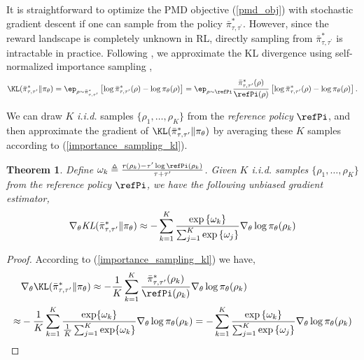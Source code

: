 \documentclass{article}
\newtheorem{thm}{Theorem}
\begin{document}
It is straightforward to optimize the PMD objective (\ref{pmd_obj}) with stochastic gradient descent if one can sample from the policy $\bar{\pi}_{\tau,\tau^{\prime}}^*$. However, since the reward landscape is completely unknown in RL, directly sampling from $\bar{\pi}_{\tau,\tau^{\prime}}^*$ is intractable in practice. Following \cite{nachum2017improving}, we approximate the KL divergence using self-normalized importance sampling \cite{owen2013monte},
\begin{equation}
\label{importance_sampling_kl}
\KL(\bar{\pi}_{\tau,\tau^{\prime}}^* \| \pi_\theta) = \ep_{\rho \sim \bar{\pi}_{\tau,\tau^{\prime}}^* } \left[ \log \bar{\pi}_{\tau,\tau^{\prime}}^*(\rho) - \log \pi_\theta(\rho) \right] = \ep_{\rho\sim \refPi} \frac{\bar{\pi}_{\tau,\tau^{\prime}}^*(\rho)}{\refPi(\rho)} \left[ \log \bar{\pi}_{\tau,\tau^{\prime}}^*(\rho) - \log \pi_\theta(\rho) \right].
\end{equation}

We can draw $K$ \textit{i.i.d.} samples $\{\rho_1, \dots, \rho_K\}$ from the \emph{reference policy} $\refPi$, and then approximate the gradient of $\KL(\bar{\pi}_{\tau,\tau^{\prime}}^* \| \pi_\theta)$ by averaging these $K$ samples according to (\ref{importance_sampling_kl}). 

\begin{thm}
Define $\omega_k \triangleq \frac{r(\rho_k) - \tau^{\prime} \log{\refPi(\rho_k)} }{\tau + \tau^{\prime}}$. Given $K$ \emph{i.i.d.} samples $\{\rho_1, \dots, \rho_K\}$ from the \emph{reference policy} $\refPi$, we have the following unbiased gradient estimator,
\begin{equation}
\label{gradient_estimator}
\nabla_{\theta} \text{\em KL}(\bar{\pi}_{\tau,\tau^{\prime}}^* \| \pi_\theta)\approx -\sum\limits_{k=1}^K{ \frac{ \exp\left\{ \omega_k \right\} }{ \sum_{j=1}^K{ \exp\left\{ \omega_j \right\}}} \nabla_{\theta} \log{\pi_\theta(\rho_k)} }
\end{equation}
\end{thm}
\begin{proof}
According to (\ref{importance_sampling_kl}) we have,
\begin{equation}
\begin{split}
&\nabla_{\theta} \KL(\bar{\pi}_{\tau,\tau^{\prime}}^* \| \pi_\theta) \approx -\frac{1}{K}\sum_{k=1}^K \frac{\bar{\pi}_{\tau,\tau^{\prime}}^* (\rho_k)}{\refPi(\rho_k)} \nabla_{\theta} \log \pi_\theta(\rho_k) \\ 
\approx & -\frac{1}{K}\sum_{k=1}^K \frac{\exp \{\omega_k\}} {\frac{1}{K} \sum_{j=1}^K \exp \{\omega_k\}} \nabla_{\theta} \log \pi_\theta(\rho_k) =  -\sum\limits_{k=1}^K{ \frac{ \exp\left\{ \omega_k \right\} }{ \sum_{j=1}^K{ \exp\left\{ \omega_j \right\}}} \nabla_{\theta} \log{\pi_\theta(\rho_k)} } \qedhere
\end{split}
\end{equation}
\end{proof}
\end{document}
